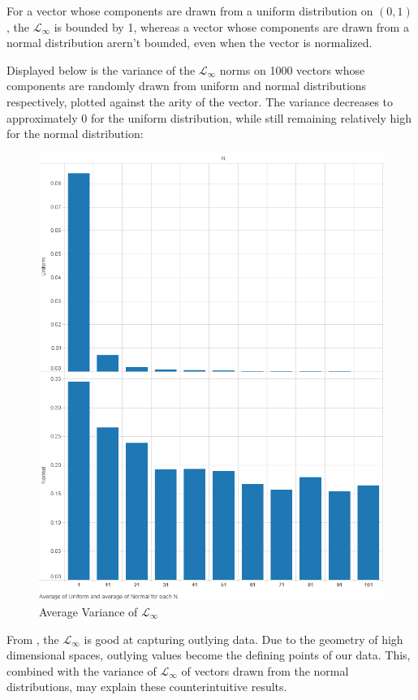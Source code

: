 \documentclass{article}
\begin{document}
For a vector whose components are drawn from a uniform distribution on $(0, 1)$, the $\mathcal{L}_{\infty}$ is bounded by 1, whereas a vector whose components are drawn from a normal distribution arern't bounded, even when the vector is normalized.

Displayed below is the variance of the $\mathcal{L}_{\infty}$ norms on 1000 vectors whose components are randomly drawn from uniform and normal distributions respectively, plotted against the arity of the vector.  The variance decreases to approximately 0 for the uniform distribution, while still remaining relatively high for the normal distribution:
\begin{figure}[H]
\centering
        \includegraphics[width=\textwidth]{exp2-var-norm.png}
        \caption{Average Variance of $\mathcal{L}_{\infty}$}
        \label{fig:exp2varnorm}
\end{figure}
From \cite{simlinf}, the $\mathcal{L}_{\infty}$ is good at capturing outlying data. Due to the geometry of high dimensional spaces, outlying values become the defining points of our data. This, combined with the variance of $\mathcal{L}_{\infty}$ of vectors drawn from the normal distributions, may explain these counterintuitive results.
\end{document}
